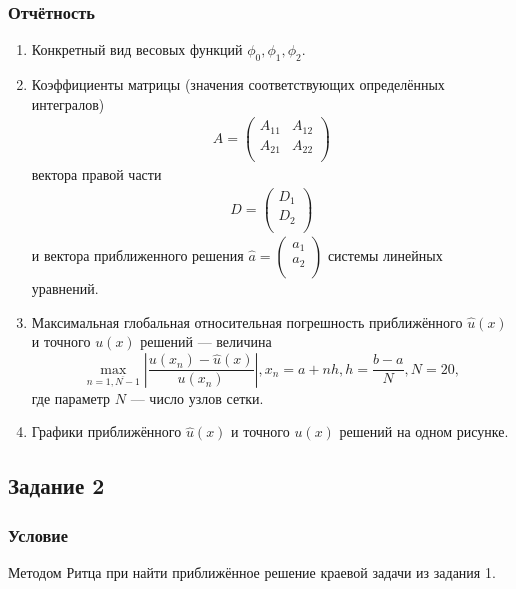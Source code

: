 \documentclass[oneside, final, 12pt]{article}
\begin{document}
\subsubsection{Отчётность}
\begin{enumerate}
    \item Конкретный вид весовых функций $\phi_0, \phi_1, \phi_2$.
    \item Коэффициенты матрицы (значения соответствующих определённых интегралов)
    \begin{align*}
        A = \begin{pmatrix}
      A_{11} & A_{12} \\
      A_{21} & A_{22} \\
     \end{pmatrix}
    \end{align*}
    вектора правой части
    \begin{align*}
      D = \begin{pmatrix}
    D_{1} \\
    D_{2} \\
   \end{pmatrix}
    \end{align*}
    и вектора приближенного решения $\hat{a} = \begin{pmatrix}
  a_{1} \\
  a_{2} \\
 \end{pmatrix}$ системы линейных уравнений.
    \item Максимальная глобальная относительная погрешность приближённого $\hat{u} (x)$ и точного $u(x)$  решений — величина \begin{equation*}
        \max\limits_{n = \overline{1, N-1}} \left| \dfrac{u(x_n) - \hat{u}(x)}{u(x_n)} \right|, x_n = a + n h, h = \dfrac{b - a}{N}, N = 20,
    \end{equation*}
    где параметр $N$ — число узлов сетки.
    \item Графики приближённого $\hat{u}(x)$ и точного $u(x)$ решений на одном рисунке.
\end{enumerate}

\subsection{Задание 2}
\subsubsection{Условие}
Методом Ритца при  найти приближённое решение краевой задачи из задания 1.
\end{document}
